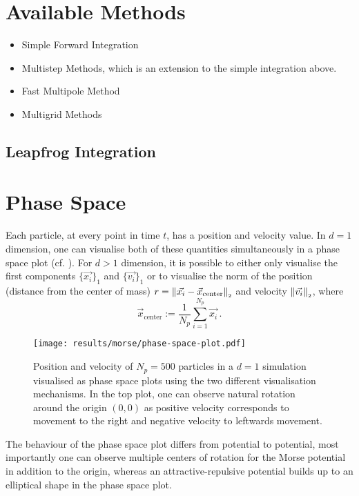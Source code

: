 \section{Available Methods}
\begin{itemize}
  \item Simple Forward Integration
  \item Multistep Methods, which is an extension to the simple integration above.
  \item Fast Multipole Method
  \item Multigrid Methods
\end{itemize}
\hierKoennteIhreWerbungStehen

\subsection{Leapfrog Integration}

\hierKoennteIhreWerbungStehen

\section{Phase Space}
Each particle, at every point in time $t$, has a position and velocity value.
In $d=1$ dimension, one can visualise both of these quantities simultaneously in a phase space plot (cf. ).
For $d > 1$ dimension, it is possible to either only visualise the first components $\{\vec{x_i}\}_1$ and $\{\vec{v_i}\}_1$ or to visualise the norm of the position (distance from the center of mass) $r = \left\lVert\vec{x_i} - \vec{x}_{\text{center}}\right\rVert_{\scriptscriptstyle 2}$ and velocity $\left\lVert\vec{v_i}\right\rVert_{\scriptscriptstyle 2}$, where $$\vec{x}_{\text{center}} := \frac{1}{N_p} \sum_{i=1}^{N_p} \vec{x_i}\,.$$

\begin{figure}[H]
  \centering
  \label{fig:phase-space-plot}
  \texttt{[image: results/morse/phase-space-plot.pdf]}
  \caption[Phase Space Plots]{Position and velocity of $N_p = 500$ particles in a $d=1$ simulation visualised as phase space plots using the two different visualisation mechanisms. In the top plot, one can observe natural rotation around the origin $(0, 0)$ as positive velocity corresponds to movement to the right and negative velocity to leftwards movement.}
\end{figure}

The behaviour of the phase space plot differs from potential to potential, most importantly one can observe multiple centers of rotation for the Morse potential in addition to the origin, whereas an attractive-repulsive potential builds up to an elliptical shape in the phase space plot.

